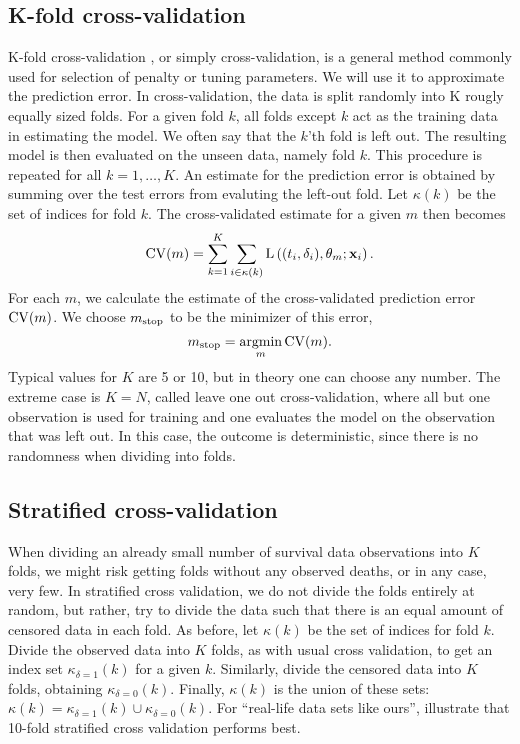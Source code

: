 \subsection{K-fold cross-validation}
K-fold cross-validation \citep{lachenbruch}, or simply cross-validation, is a general method commonly used for selection of penalty or tuning parameters. We will use it to approximate the prediction error. In cross-validation, the data is split randomly into K rougly equally sized folds. For a given fold $k$, all folds except $k$ act as the training data in estimating the model. We often say that the $k$'th fold is left out. The resulting model is then evaluated on the unseen data, namely fold $k$. This procedure is repeated for all $k=1,\ldots,K$. An estimate for the prediction error is obtained by summing over the test errors from evaluting the left-out fold. Let $\kappa(k)$ be the set of indices for fold $k$. The cross-validated estimate for a given $m$ then becomes
\begin{equation}
    \operatorname{CV}(m)=\sum_{k=1}^K\sum_{i\in\kappa(k)}\operatorname{L}\left((t_i,\delta_i),\theta_m;\mathbf{x}_i\right).
\end{equation}
For each $m$, we calculate the estimate of the cross-validated prediction error $\operatorname{CV}(m)$. We choose $m_{\text{stop}}$ to be the minimizer of this error,
\begin{equation}
    m_{\text{stop}}=\operatorname*{argmin}_{m}\operatorname{CV}(m).
\end{equation}
Typical values for $K$ are 5 or 10, but in theory one can choose any number. The extreme case is $K=N$, called leave one out cross-validation, where all but one observation is used for training and one evaluates the model on the observation that was left out. In this case, the outcome is deterministic, since there is no randomness when dividing into folds.

\subsection{Stratified cross-validation}
When dividing an already small number of survival data observations into $K$ folds, we might risk getting folds without any observed deaths, or in any case, very few. In stratified cross validation, we do not divide the folds entirely at random, but rather, try to divide the data such that there is an equal amount of censored data in each fold.
As before, let $\kappa(k)$ be the set of indices for fold $k$. Divide the observed data into $K$ folds, as with usual cross validation, to get an index set $\kappa_{\delta=1}(k)$ for a given $k$. Similarly, divide the censored data into $K$ folds, obtaining $\kappa_{\delta=0}(k)$. Finally, $\kappa(k)$ is the union of these sets: $\kappa(k)=\kappa_{\delta=1}(k)\cup\kappa_{\delta=0}(k)$. For ``real-life data sets like ours'', \citet{kohavi} illustrate that 10-fold stratified cross validation performs best.

